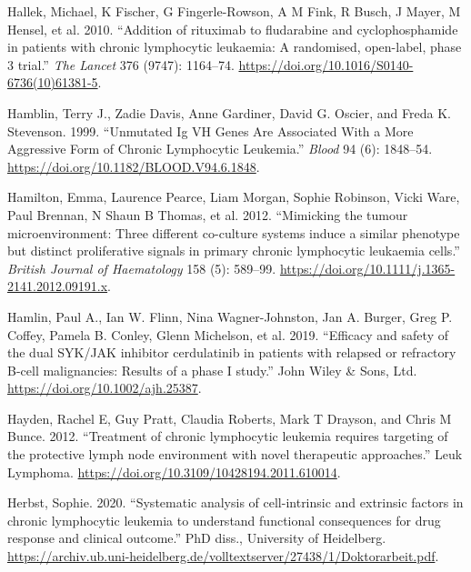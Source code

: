 \documentclass[11pt, a4paper, twosided]{book}
\newenvironment{CSLReferences}%
  {}%
  {\par}
\begin{document}
\begin{CSLReferences}{1}{0}
\leavevmode{}%
Hallek, Michael, K Fischer, G Fingerle-Rowson, A M Fink, R Busch, J Mayer, M Hensel, et al. 2010. {``{Addition of rituximab to fludarabine and cyclophosphamide in patients with chronic lymphocytic leukaemia: A randomised, open-label, phase 3 trial}.''} \emph{The Lancet} 376 (9747): 1164--74. \url{https://doi.org/10.1016/S0140-6736(10)61381-5}.

\leavevmode{}%
Hamblin, Terry J., Zadie Davis, Anne Gardiner, David G. Oscier, and Freda K. Stevenson. 1999. {``{Unmutated Ig VH Genes Are Associated With a More Aggressive Form of Chronic Lymphocytic Leukemia}.''} \emph{Blood} 94 (6): 1848--54. \url{https://doi.org/10.1182/BLOOD.V94.6.1848}.

\leavevmode{}%
Hamilton, Emma, Laurence Pearce, Liam Morgan, Sophie Robinson, Vicki Ware, Paul Brennan, N Shaun B Thomas, et al. 2012. {``{Mimicking the tumour microenvironment: Three different co-culture systems induce a similar phenotype but distinct proliferative signals in primary chronic lymphocytic leukaemia cells}.''} \emph{British Journal of Haematology} 158 (5): 589--99. \url{https://doi.org/10.1111/j.1365-2141.2012.09191.x}.

\leavevmode{}%
Hamlin, Paul A., Ian W. Flinn, Nina Wagner-Johnston, Jan A. Burger, Greg P. Coffey, Pamela B. Conley, Glenn Michelson, et al. 2019. {``{Efficacy and safety of the dual SYK/JAK inhibitor cerdulatinib in patients with relapsed or refractory B-cell malignancies: Results of a phase I study}.''} John Wiley \& Sons, Ltd. \url{https://doi.org/10.1002/ajh.25387}.

\leavevmode{}%
Hayden, Rachel E, Guy Pratt, Claudia Roberts, Mark T Drayson, and Chris M Bunce. 2012. {``{Treatment of chronic lymphocytic leukemia requires targeting of the protective lymph node environment with novel therapeutic approaches}.''} Leuk Lymphoma. \url{https://doi.org/10.3109/10428194.2011.610014}.

\leavevmode{}%
Herbst, Sophie. 2020. {``{Systematic analysis of cell-intrinsic and extrinsic factors in chronic lymphocytic leukemia to understand functional consequences for drug response and clinical outcome}.''} PhD diss., University of Heidelberg. \url{https://archiv.ub.uni-heidelberg.de/volltextserver/27438/1/Doktorarbeit.pdf}.


\end{CSLReferences}
\end{document}
